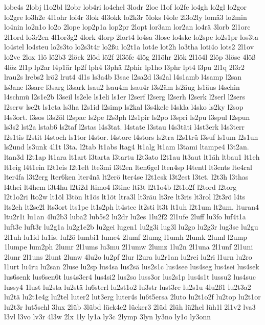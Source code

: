 {lobe4s
2lobj
l1o2bl
l2obr
lob4ri
lo4chel
3lodr
2loe
l1of
lo2fe
lo4gh
lo2gl
lo2gor
lo2gre
lo3h2e
4l1ohr
loi4r
3lok
4l3okk
lo2k3r
5loks
l4ole
2l3o2ly
lomä3
lo2min
lo4nin
lo2n1o
lo2o
2lope
lop2p1a
lop2pr
2lopt
lor3am
lor2an
lo4rä
3lorb
2l1orc
2l1ord
lo3r2en
4l1or3g2
4lork
4lorp
2lort4
lo4sa
3lose
lo4ske
lo2spe
lo2s1pr
los3ta
lo4stel
lo4steu
lo2s3to
lo2s3t4r
lo2ßu
lo2t1a
lot4e
lot2h
lo3tha
loti4o
lots2
2l1ov
lo2ve
2lox
1lö
lö2b3
2löck
2löd
lö2f
2l3öfe
4lög
2l1öhr
2lök
2l1ö4l
2löp
3lösc
4löß
4löz
2l1p
lp2ar
l4p1är
lp2f
lph4
l3phä
l2phir
lp1ho
l3phr
lpt4
l3pu
2l1q
2l3r2
lrau2s
lrebs2
lrö2
lrut4
4l1s
ls3a4b
l3sac
l2sa2d
l3s2al
l4s1amb
l4samp
l2san
ls3ane
l3sare
l3sarg
l3sark
lsau2
lsau4m
lsau4r
l3s2äm
ls2äug
ls1äus
l4schin
l4schmü
l2s1e2b
l3seil
ls2ele
ls1eli
ls1er
l2serf
l2serg
l2serh
l2serk
l2serl
l2sers
l2serw
lse2t
ls1eta
ls3ha
l2s1id
l2simp
ls2kal
l3s4kele
l4skla
l4sko
ls2ky
l2sop
l4s3ort.
l3sos
l3s2öl
l2spac
ls2pe
l2s3ph
l2s1pir
ls2po
l3spri
ls2pu
l3spul
l2spun
ls3s2
lst2a
lstab6
ls2taf
l2stas
l4s3tat.
l4state
l3stau
l4s3täti
l4st3erk
l4s3terr
l2s1tis
l2stit
l4stoch
ls1tor
l4stor.
l4store
l4stors
ls2tra
l2s1trü
l3suf
ls1um
l2s1un
ls2und
ls3unk
4l1t
l3ta.
l2tab
lt1abs
ltag4
lt1alg
lt1am
l3tami
ltampe4
l3t2an.
ltan3d
l2t1ap
lt1ara
lt1art
l3tarta
l3tartu
l2t3ato
l2t1au
lt3aut
lt1äh
ltbau1
lt1eh
lt1eig
l4t1ein
l2t1eis
l2t1elt
lte3mi
l3t2en
lten6gel
lten4sp
l4tentl
lt3ents
lte4ral
lter4fa
l3t2erg
lter6ken
lter4nä
lt2erö
lter4se
l2t1esk
l3t2est
l3tet.
l2t3h
l3thas
l4thei
lt4hem
l3t4hu
l2ti2d
ltimo4
l3tine
lti3t
l2t1o4b
l2t1o2f
l2tord
l2torg
l2t1o2ri
lto2w
lt1öl
l3tön
lt1ös
lt1öt
ltra3l
lt3räu
lt3re
lt3ris
lt3rol
l2t3rö
l4ts
lts2eh
lt2se2l
lts3ort
lts1pe
lt1s2ph
lt4stec
lt2sti
lt3t
lt1uh
l2t1um
lt2um.
lturan4
ltu2r1i
lu1an
4lu2b3
luba2
lub5s2
lu2dr
lu2es
1lu2f2
2l1ufe
2luff
lu3fo
luf4t1a
luft3e
luft3r
lu2g1a
lu2g1e2b
lu2gei
lugen1
lu2g3i
lug3l
lu2go
lu2g3r
lug3se
lu2gu
2l1uh
lu1id
lu1is.
lul2ö
lumbi1
lume4
2lumf
2lumg
l1umh
2lumk
2luml
l2ump
1lumpe
lum2ph
2lumr
2l1ums
lu3mu
2l1umw
2lumz
1lu2n
2l1una
2l1unf
2l1uni
2lunr
2l1uns
2lunt
2lunw
4lu2o
lu2pf
2lur
l2ura
lu2r1an
lu2rei
lu2ri
l1urn
lu2ro
l1urt
lu4ru
lu2san
2luse
lu2sp
lus4sa
lus2sä
lus2s1c
lus4see
lus4seg
lus4sei
lus4sek
lus6senk
lus6sen6t
lus4s3er4
lus4si2
lus2so
luss3or
lus2s1p
lus4s1t
lussu2
lus4suc
lussy4
1lust
lu2sta
lu2stä
lu6sterl
lu2st1o2
lu3str
lust3re
lu2s1u
4lu2ß1
lu2t3a2
lu2tä
lu2t1e4g
lu2tel
luter2
lut3erg
luter4s
lu6t5ersa
2luto
lu2t1o2f
lu2top
lu2t1or
lu2t3r
lut5schl
3lux
2lüb
3lübd
lück4e2
lücker3
2lüd
2lüh
lü2hel
lüh1l
2l1v2
lva3
l3vl
l3vo
lv3r
4l3w
2lx
1ly
ly1a
ly3c
2lymp
3lyn
ly3no
ly1o
ly3onn
}
